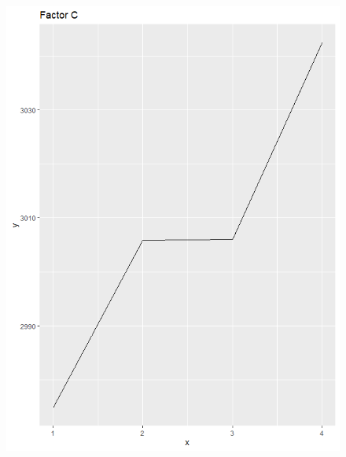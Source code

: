 \begin{figure}[H]
\begin{minipage}[b]{0.33\linewidth}
		\includegraphics[width=1\linewidth]{simulations/taguchi/plots/main_effect_c} 
	\end{minipage}
	

\end{figure}

